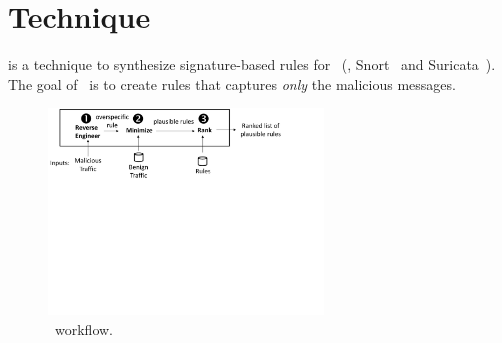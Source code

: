 \documentclass[sigconf,anonymous]{acmart}
\begin{document}

\subsection{}
\label{sec:content-example}




\section{Technique}

\tname{} is a technique to synthesize signature-based rules for
\nids~(\eg{}, Snort~\cite{snort} and Suricata~\cite{suricata}). The
goal of \tname\ is to create rules that captures \emph{only} the
malicious messages. 

\begin{figure}[t]
\centering
\includegraphics[trim=0 350 100 0,clip,width=0.65\textwidth]{figs/nids-workflow}
\caption{\tname\ workflow.}
\label{fig:overview}
\end{figure}
\end{document}
